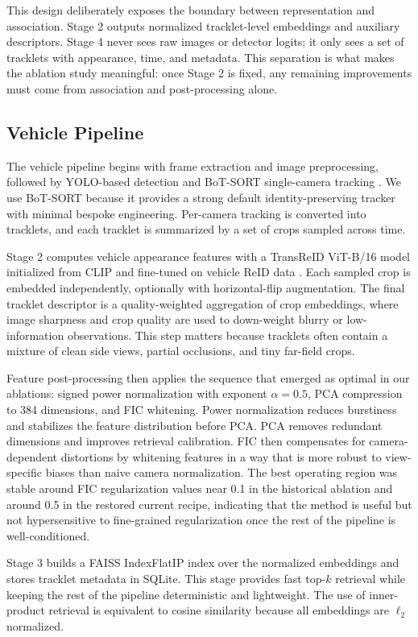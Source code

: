 \documentclass{ieeeaccess}
\begin{document}
This design deliberately exposes the boundary between representation and association. Stage 2 outputs normalized tracklet-level embeddings and auxiliary descriptors. Stage 4 never sees raw images or detector logits; it only sees a set of tracklets with appearance, time, and metadata. This separation is what makes the ablation study meaningful: once Stage 2 is fixed, any remaining improvements must come from association and post-processing alone.

\subsection{Vehicle Pipeline}
The vehicle pipeline begins with frame extraction and image preprocessing, followed by YOLO-based detection and BoT-SORT single-camera tracking \cite{botsort,ultralytics}. We use BoT-SORT because it provides a strong default identity-preserving tracker with minimal bespoke engineering. Per-camera tracking is converted into tracklets, and each tracklet is summarized by a set of crops sampled across time.

Stage 2 computes vehicle appearance features with a TransReID ViT-B/16 model initialized from CLIP and fine-tuned on vehicle ReID data \cite{transreid,clip}. Each sampled crop is embedded independently, optionally with horizontal-flip augmentation. The final tracklet descriptor is a quality-weighted aggregation of crop embeddings, where image sharpness and crop quality are used to down-weight blurry or low-information observations. This step matters because tracklets often contain a mixture of clean side views, partial occlusions, and tiny far-field crops.

Feature post-processing then applies the sequence that emerged as optimal in our ablations: signed power normalization with exponent $\alpha=0.5$, PCA compression to 384 dimensions, and FIC whitening. Power normalization reduces burstiness and stabilizes the feature distribution before PCA. PCA removes redundant dimensions and improves retrieval calibration. FIC then compensates for camera-dependent distortions by whitening features in a way that is more robust to view-specific biases than naive camera normalization. The best operating region was stable around FIC regularization values near 0.1 in the historical ablation and around 0.5 in the restored current recipe, indicating that the method is useful but not hypersensitive to fine-grained regularization once the rest of the pipeline is well-conditioned.

Stage 3 builds a FAISS IndexFlatIP index over the normalized embeddings and stores tracklet metadata in SQLite. This stage provides fast top-$k$ retrieval while keeping the rest of the pipeline deterministic and lightweight. The use of inner-product retrieval is equivalent to cosine similarity because all embeddings are $\ell_2$ normalized.
\end{document}

